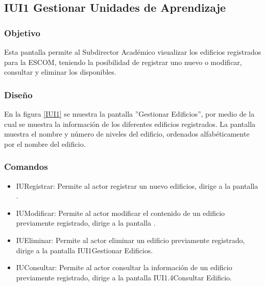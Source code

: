 \subsection{IUI1 Gestionar Unidades de Aprendizaje}

\subsubsection{Objetivo}
	
	Esta pantalla permite al Subdirector Académico visualizar los edificios registrados para la ESCOM, teniendo la posibilidad de registrar uno nuevo o modificar, consultar y eliminar los disponibles.

\subsubsection{Diseño}

    En la figura \ref{IUI1} se muestra la pantalla ''Gestionar Edificios'', por medio de la cual se muestra la información de los diferentes edificios registrados. La pantalla muestra el nombre y número de niveles del edificio, ordenados alfabéticamente por el nombre del edificio.
 

\subsubsection{Comandos}
    \begin{itemize}
	\item IURegistrar: Permite al actor registrar un nuevo edificios, dirige a la pantalla .
	
	\item IUModificar: Permite al actor modificar el contenido de un edificio previamente registrado, dirige a la pantalla .
	
	\item IUEliminar: Permite al actor eliminar un edificio previamente registrado, dirige a la pantalla {IUI1}{Gestionar Edificios}.
	
	\item IUConsultar: Permite al actor consultar la información de un edificio previamente registrado, dirige a la pantalla {IUI1.4}{Consultar Edificio}.
    \end{itemize}
